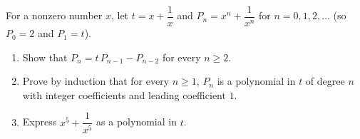 For a nonzero number $x$, let $t=x+\dfrac1x$ and $P_n=x^n+\dfrac{1}{x^n}$ for $n=0,1,2,\dots$ (so $P_0=2$ and $P_1=t$).
\begin{enumerate}
\item[(a)] Show that $P_n=t\,P_{n-1}-P_{n-2}$ for every $n\ge2$.
\item[(b)] Prove by induction that for every $n\ge1$, $P_n$ is a polynomial in $t$ of degree $n$ with integer coefficients and leading coefficient $1$.
\item[(c)] Express $x^5+\dfrac{1}{x^5}$ as a polynomial in $t$.
\end{enumerate}
